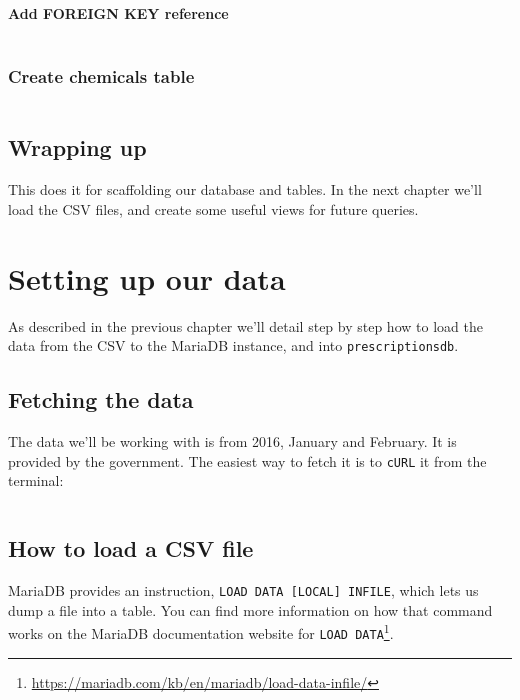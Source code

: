 \documentclass[english,a4paper,]{report}
\renewcommand{\href}[2]{#2\footnote{\url{#1}}}
\begin{document}
\subsubsection{Add FOREIGN KEY
reference}\label{add-foreign-key-reference-1}

\inputminted[firstline=48,lastline=48]{sql}{src/sql/00-setup.sql}

\subsection{Create chemicals table}\label{create-chemicals-table}

\inputminted[firstline=38,lastline=41]{sql}{src/sql/00-setup.sql}

\section{Wrapping up}\label{wrapping-up}

This does it for scaffolding our database and tables. In the next
chapter we'll load the CSV files, and create some useful views for
future queries.

\chapter{Setting up our data}\label{setting-up-our-data}

As described in the previous chapter we'll detail step by step how to
load the data from the CSV to the MariaDB instance, and into
\texttt{prescriptionsdb}.

\section{Fetching the data}\label{fetching-the-data}

The data we'll be working with is from 2016, January and February. It is
provided by the government. The easiest way to fetch it is to
\texttt{cURL} it from the terminal:

\inputminted[lastline=114]{bash}{setup}

\section{How to load a CSV file}\label{how-to-load-a-csv-file}

MariaDB provides an instruction,
\texttt{LOAD\ DATA\ {[}LOCAL{]}\ INFILE}, which lets us dump a file into
a table. You can find more information on how that command works on the
MariaDB documentation website for
\href{https://mariadb.com/kb/en/mariadb/load-data-infile/}{\texttt{LOAD\ DATA}}.
\end{document}
